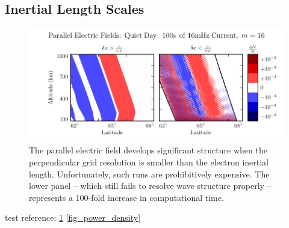 \subsection{Inertial Length Scales}
  \label{sec_lengths}


\begin{figure}[!htb]
    \centering
    \includegraphics[width=\textwidth]{figures/inertial_length.pdf}
    \caption[Parallel Electric Fields by Perpendicular Grid Resolution]{
      The parallel electric field develops significant structure when the perpendicular grid resolution is smaller than the electron inertial length. Unfortunately, such runs are prohibitively expensive. The lower panel -- which still fails to resolve wave structure properly -- represents a 100-fold increase in computational time. 
    }
    \label{fig_inertial_length}
\end{figure}







test reference: \cref{fig_inertial_length} \cref{fig_power_density}



